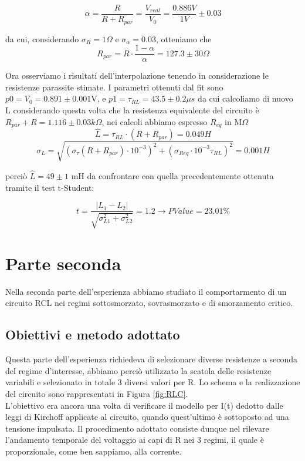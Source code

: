 \documentclass[a4paper]{article}
\theoremstyle{definition}
\begin{document}
\[\alpha = \frac{R}{R + R_{par}} = \frac{V_{real}}{V_{0}} = \frac{0.886V}{1V} \pm 0.03 \]

da cui, considerando \(\sigma_{R} = 1 \Omega\) e \(\sigma_{\alpha} = 0.03\), otteniamo che \\
\[R_{par} = R\cdot \frac{1 - \alpha}{\alpha} = 127.3 \pm 30 \Omega\]

\noindent Ora osserviamo i risultati dell'interpolazione tenendo in considerazione le resistenze parassite stimate. I parametri ottenuti dal fit sono \(p0 = V_{0} = 0.891 \pm  0.001 \)V, e \( p1 =\tau_{RL} = 43.5 \pm 0.2 \mu s\) da cui calcoliamo di nuovo L considerando questa volta che la resistenza equivalente del circuito è \(R_{par} + R = 1.116 \pm 0.03 k\Omega\), nei calcoli abbiamo espresso \(R_{eq}\) in M\(\Omega\)\\

\[\hat{L} = \tau_{RL}\cdot (R + R_{par}) = 0.049 H\]
\[ \sigma_{L}= \sqrt{(\sigma_{\tau} (R + R_{par}) \cdot10^{-3})^{2} + (\sigma_{Req} \cdot 10^{-3}\tau_{RL})^{2}} = 0.001 H\] 

\noindent perciò \(\hat{L} = 49 \pm 1\) mH da confrontare con quella precedentemente ottenuta tramite il test t-Student:

\[t = \frac{\left|L_{1} - L_{2} \right|}{\sqrt{\sigma^{2}_{L1} + \sigma^{2}_{L2}} } = 1.2 \rightarrow PValue = 23.01\% \]

\pagebreak

\section{Parte seconda}

Nella seconda parte dell'esperienza abbiamo studiato il comportarmento di un circuito RCL nei regimi sottosmorzato, sovrasmorzato e di smorzamento critico.

\subsection{Obiettivi e metodo adottato}
Questa parte dell'esperienza richiedeva di selezionare diverse resistenze a seconda del regime d'interesse, abbiamo perciò utilizzato la scatola delle resistenze variabili e selezionato in totale 3 diversi valori per R. Lo schema e la realizzazione del circuito sono rappresentati in Figura \ref{fig:RLC}. \\

\noindent L'obiettivo era ancora una volta di verificare il modello per I(t) dedotto dalle leggi di Kirchoff applicate al circuito, quando quest'ultimo è sottoposto ad una tensione impulsata. Il procedimento adottato consiste dunque nel rilevare l'andamento temporale del voltaggio ai capi di R nei 3 regimi, il quale è proporzionale, come ben sappiamo, alla corrente.
\end{document}
